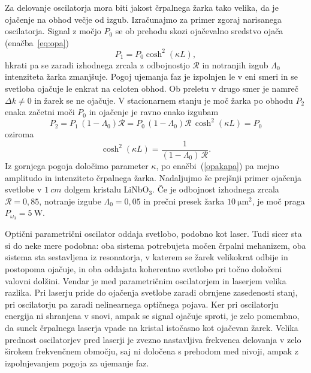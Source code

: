 Za delovanje oscilatorja mora biti jakost črpalnega žarka tako velika, da je 
ojačenje na obhod večje od izgub. Izračunajmo za primer zgoraj narisanega 
oscilatorja. Signal z močjo 
$P_0$ se ob prehodu skozi ojačevalno sredstvo ojača (enačba~\ref{eq:opa})
\begin{equation}
P_1 = P_0 \cosh^2 (\kappa L),
\end{equation}
hkrati pa se zaradi izhodnega zrcala z odbojnostjo $\mathcal{R}$ in notranjih izgub $\Lambda_0$ 
intenziteta žarka zmanjšuje. Pogoj ujemanja faz je izpolnjen le v eni smeri in se svetloba
ojačuje le enkrat na celoten obhod. Ob preletu v drugo smer je namreč $\Delta k \neq 0$ in žarek se ne ojačuje. V stacionarnem stanju je moč 
žarka po obhodu $P_2$ enaka začetni moči $P_0$ in ojačenje je ravno enako izgubam 
\begin{equation}
P_2 = P_1\,(1-\Lambda_0)\mathcal{R} = P_0 \,(1-\Lambda_0) \mathcal{R} \,\cosh^2 (\kappa L) = P_0
\end{equation}
oziroma
\begin{equation}
\cosh^2 (\kappa L) =\frac{1}{(1-\Lambda_0)\, \mathcal{R}}.
\end{equation}
Iz gornjega pogoja določimo parameter $\kappa$, po enačbi~(\ref{opakapa}) pa mejno 
amplitudo in intenziteto črpalnega žarka. Nadaljujmo še prejšnji primer ojačenja 
svetlobe v $1~\si{cm}$ dolgem kristalu LiNbO$_{3}$.
Če je odbojnost izhodnega zrcala $\mathcal{R}=0,85$, notranje izgube $\Lambda_0 = 0,05$ in prečni presek 
žarka $10~\si{\micro\metre^2}$, je moč praga $P_{\omega_3} = 5~\si{\watt}$.

\begin{remark}
Optični parametrični oscilator oddaja svetlobo, podobno kot laser. Tudi sicer
sta si do neke mere podobna: oba sistema potrebujeta močen črpalni mehanizem, oba sistema
sta sestavljena iz resonatorja, v katerem se žarek velikokrat odbije in postopoma ojačuje,
in oba oddajata koherentno svetlobo pri točno določeni valovni dolžini. Vendar
je med parametričnim oscilatorjem in laserjem velika razlika. Pri laserju pride do
ojačenja svetlobe zaradi obrnjene zasedenosti stanj, pri oscilatorju pa 
zaradi nelinearnega optičnega pojava. Ker pri oscilatorju energija ni shranjena v
snovi, ampak se signal ojačuje sproti, je zelo pomembno, da sunek črpalnega laserja vpade
na kristal istočasno kot ojačevan žarek. Velika prednost oscilatorjev pred laserji 
je zvezno nastavljiva frekvenca delovanja v zelo širokem frekvenčnem območju, saj ni določena
s prehodom med nivoji, ampak z izpolnjevanjem pogoja za ujemanje faz.
\end{remark}

